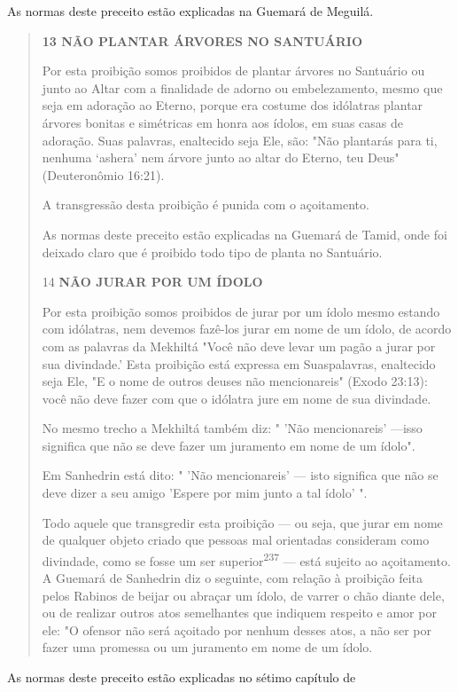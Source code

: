 As normas deste preceito estão explicadas na Guemará de Meguilá.

\begin{quote}
\textbf{13 NÃO PLANTAR ÁRVORES NO SANTUÁRIO}

Por esta proibição somos proibidos de plantar árvores no Santuário ou
junto ao Altar com a finalidade de adorno ou embelezamento, mesmo que
seja em adoração ao Eterno, porque era costume dos idólatras plantar
árvores bonitas e simétricas em honra aos ídolos, em suas casas de
adoração. Suas pala­vras, enaltecido seja Ele, são: "Não plantarás para
ti, nenhuma `ashera' nem ár­vore junto ao altar do Eterno, teu Deus"
(Deuteronômio 16:21).

A transgressão desta proibição é punida com o açoitamento.

As normas deste preceito estão explicadas na Guemará de Tamid, onde foi
deixado claro que é proibido todo tipo de planta no Santuário.

14 \textbf{NÃO JURAR POR UM ÍDOLO}

Por esta proibição somos proibidos de jurar por um ídolo mesmo estando
com idólatras, nem devemos fazê-los jurar em nome de um ídolo, de acordo
com as palavras da Mekhiltá "Você não deve levar um pagão a jurar por
sua divindade.' Esta proibição está expressa em Suaspalavras, enaltecido
seja Ele, "E o nome de outros deuses não mencionareis" (Exodo 23:13):
você não deve fazer com que o idólatra jure em nome de sua divindade.

No mesmo trecho a Mekhiltá também diz: " 'Não mencionareis' ---isso
significa que não se deve fazer um juramento em nome de um ídolo".

Em Sanhedrin está dito: " 'Não mencionareis' --- isto significa que não
se deve dizer a seu amigo 'Espere por mim junto a tal ídolo' ".

Todo aquele que transgredir esta proibição --- ou seja, que jurar em
nome de qualquer objeto criado que pessoas mal orientadas consideram
como divindade, como se fosse um ser superior\textsuperscript{237} ---
está sujeito ao açoitamento. A Guemará de Sanhedrin diz o seguinte, com
relação à proibição feita pelos Rabi­nos de beijar ou abraçar um ídolo,
de varrer o chão diante dele, ou de realizar outros atos semelhantes que
indiquem respeito e amor por ele: "O ofensor não será açoitado por
nenhum desses atos, a não ser por fazer uma promessa ou um juramento em
nome de um ídolo.
\end{quote}

As normas deste preceito estão explicadas no sétimo capítulo de

